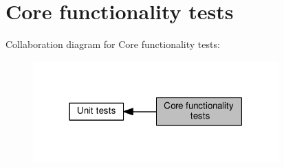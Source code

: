 \hypertarget{group__basictests}{}\section{Core functionality tests}
\label{group__basictests}
Collaboration diagram for Core functionality tests\+:
\nopagebreak
\begin{figure}[H]
\begin{center}
\leavevmode
\includegraphics[width=268pt]{group__basictests}
\end{center}
\end{figure}

